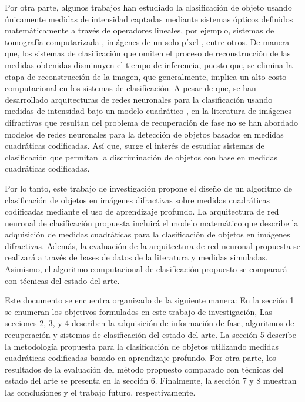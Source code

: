 Por otra parte, algunos trabajos han estudiado la clasificación de objeto usando únicamente medidas de intensidad captadas mediante sistemas ópticos definidos matemáticamente a través de operadores lineales, por ejemplo, sistemas de tomografía computarizada , imágenes de un solo píxel , entre otros. De manera que, los sistemas de clasificación que omiten el proceso de reconstrucción de las medidas obtenidas disminuyen el tiempo de inferencia, puesto que, se elimina la etapa de reconstrucción de la imagen, que generalmente, implica un alto costo computacional en los sistemas de clasificación. A pesar de que, se han desarrollado arquitecturas de redes neuronales para la clasificación usando medidas de intensidad bajo un modelo cuadrático , en la literatura de imágenes difractivas que resultan del problema de recuperación de fase no se han abordado modelos de redes neuronales para la detección de objetos basados en medidas cuadráticas codificadas. Así que, surge el interés de estudiar sistemas de clasificación que permitan la discriminación de objetos con base en medidas cuadráticas codificadas.

Por lo tanto, este trabajo de investigación propone el diseño de un algoritmo de clasificación de objetos en imágenes difractivas sobre medidas cuadráticas codificadas mediante el uso de aprendizaje profundo. La arquitectura de red neuronal de clasificación propuesta incluirá el modelo matemático que describe la adquisición de medidas cuadráticas para la clasificación de objetos en imágenes difractivas. Además, la evaluación de la arquitectura de red neuronal propuesta se realizará a través de bases de datos de la literatura y medidas simuladas. Asimismo, el algoritmo computacional de clasificación propuesto se comparará con técnicas del estado del arte.


Este documento se encuentra organizado de la siguiente manera: En la sección 1 se enumeran los objetivos formulados en este trabajo de investigación, Las secciones 2, 3, y 4 describen la adquisición de información de fase, algoritmos de recuperación y sistemas de clasificación del estado del arte. La sección 5 describe la metodología propuesta para la clasificación de objetos utilizando medidas cuadráticas codificadas basado en aprendizaje profundo. Por otra parte, los resultados de la evaluación del método propuesto comparado con técnicas del estado del arte se presenta en la sección 6. Finalmente, la sección 7 y 8 muestran las conclusiones y el trabajo futuro, respectivamente. 


